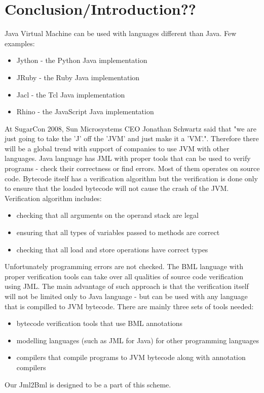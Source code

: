 \documentclass{acm_proc_article-sp}
\begin{document}
\section{Conclusion/Introduction??}
Java Virtual Machine can be used with languages different than Java. Few examples:
\begin{itemize}
	\item Jython - the Python Java implementation
	\item JRuby - the Ruby Java implementation
	\item Jacl - the Tcl Java implementation
	\item Rhino - the JavaScript Java implementation
\end{itemize}
At SugarCon 2008, Sun Microsystems CEO Jonathan Schwartz said that "we are just going to take the 'J' off the 'JVM' and just make it a 'VM'.". Therefore there will be a global trend with support of companies to use JVM with other languages. Java language has JML with proper tools that can be used to verify programs - check their correctness or find errors. Most of them operates on source code. Bytecode itself has a verification algorithm but the verification is done only to ensure that the loaded bytecode will not cause the crash of the JVM. Verification algorithm includes:
\begin{itemize}
	\item checking that all arguments on the operand stack are legal
	\item ensuring that all types of variables passed to methods are correct
	\item checking that all load and store operations have correct types
\end{itemize}
Unfortunately programming errors are not checked. The BML language with proper verification tools can take over all qualities of source code verification using JML. The main advantage of such approach is that the verification itself will not be limited only to Java language - but can be used with any language that is compilled to JVM bytecode. There are mainly three sets of tools needed:
\begin{itemize}
	\item bytecode verification tools that use BML annotations
	\item modelling languages (such as JML for Java) for other programming languages
	\item compilers that compile programs to JVM bytecode along with annotation compilers
\end{itemize}
Our Jml2Bml is designed to be a part of this scheme.
\end{document}
